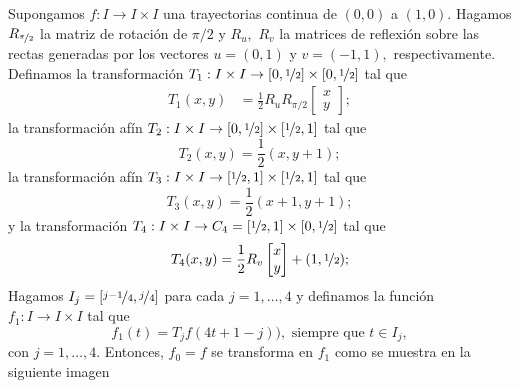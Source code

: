 Supongamos $f:I\to I\times I$ una trayectorias continua de $(0,0)$ a $(1,0).$ Hagamos $R_{\nicefrac{\pi}2}$ la matriz de rotación de $\pi/2$ y $R_{u},$ $R_v$ la matrices de reflexión sobre las rectas generadas por los vectores $u=(0,1)$ y $v=(-1,1),$ respectivamente. Definamos la transformación $T_{1}:I\times I\to [0,\nicefrac{1}{2}] \times [0,\nicefrac{1}{2}]$ tal que
\begin{align*}
    T_{1}(x,y)&=\frac{1}{2}R_{u}R_{\pi/2}\begin{bmatrix}
        x \\
        y
    \end{bmatrix};
\end{align*}
la transformación afín $T_{2}:I\times I\to [0,\nicefrac{1}{2}]\times  [\nicefrac{1}{2},1]$ tal que
\begin{equation*}
    T_{2}(x,y)=\frac{1}{2}(x,y+1);
\end{equation*}
la transformación afín $T_{3}:I\times I\to [\nicefrac{1}{2},1]\times[\nicefrac{1}{2},1]$ tal que
\begin{equation*}
    T_{3}(x,y)=\frac{1}{2}(x+1,y+1);
\end{equation*}
y la transformación $T_{4}:I\times I\to C_4=[\nicefrac{1}{2},1]\times[0,\nicefrac{1}{2}]$ tal que
\begin{equation*}
    T_{4}(x,y)=\frac{1}{2}R_{v}\begin{bmatrix}
        x \\
        y
    \end{bmatrix}+(1,\nicefrac{1}{2});
\end{equation*}
Hagamos $I_j=[\nicefrac{j-1}{4},\nicefrac{j}{4}]$ para cada $j=1,\ldots,4$ y definamos la función $f_1:I\to I\times I$ tal que
\begin{equation*}
    f_1(t)=T_jf(4t+1-j)), \text{ siempre que } t\in I_j,
\end{equation*}
con $j=1,\ldots,4$. Entonces, $f_0=f$ se transforma en $f_1$ como se muestra en la siguiente imagen
